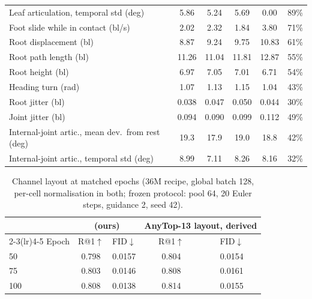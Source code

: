 \begin{table}[h]
\begin{tabular}{@{}lccccc@{}}
Leaf articulation, temporal std (deg) & \num{5.86} & \num{5.24} & \num{5.69} & \num{0.00} & \num{89}\% \\
Foot slide while in contact (bl/s) & \num{2.02} & \num{2.32} & \num{1.84} & \num{3.80} & \num{71}\% \\
Root displacement (bl) & \num{8.87} & \num{9.24} & \num{9.75} & \num{10.83} & \num{61}\% \\
Root path length (bl) & \num{11.26} & \num{11.04} & \num{11.81} & \num{12.87} & \num{55}\% \\
Root height (bl) & \num{6.97} & \num{7.05} & \num{7.01} & \num{6.71} & \num{54}\% \\
Heading turn (rad) & \num{1.07} & \num{1.13} & \num{1.15} & \num{1.04} & \num{43}\% \\
Root jitter (bl) & \num{0.038} & \num{0.047} & \num{0.050} & \num{0.044} & \num{30}\% \\
Joint jitter (bl) & \num{0.094} & \num{0.090} & \num{0.099} & \num{0.112} & \num{49}\% \\
Internal-joint artic., mean dev.\ from rest (deg) & \num{19.3} & \num{17.9} & \num{19.0} & \num{18.8} & \num{42}\% \\
Internal-joint artic., temporal std (deg) & \num{8.99} & \num{7.11} & \num{8.26} & \num{8.16} & \num{32}\% \\
\bottomrule
\end{tabular}
\end{table}

\begin{table}[h]
\centering\footnotesize
\caption{Channel layout at matched epochs (\num{36}M recipe, global batch 128, per-cell normalisation
in both; frozen protocol: pool 64, 20 Euler steps, guidance 2, seed 42).}\label{tab:repcontent}
\begin{tabular}{lcccc}
\toprule
& \multicolumn{2}{c}{\rep{} (ours)} & \multicolumn{2}{c}{AnyTop-13 layout, derived} \\
\cmidrule(lr){2-3}\cmidrule(lr){4-5}
Epoch & R@1$\uparrow$ & FID$\downarrow$ & R@1$\uparrow$ & FID$\downarrow$ \\
\midrule
50  & \num{0.798} & \num{0.0157} & \num{0.804} & \num{0.0154} \\
75  & \num{0.803} & \num{0.0146} & \num{0.808} & \num{0.0161} \\
100 & \num{0.808} & \num{0.0138} & \num{0.814} & \num{0.0155} \\
\bottomrule
\end{tabular}
\end{table}

